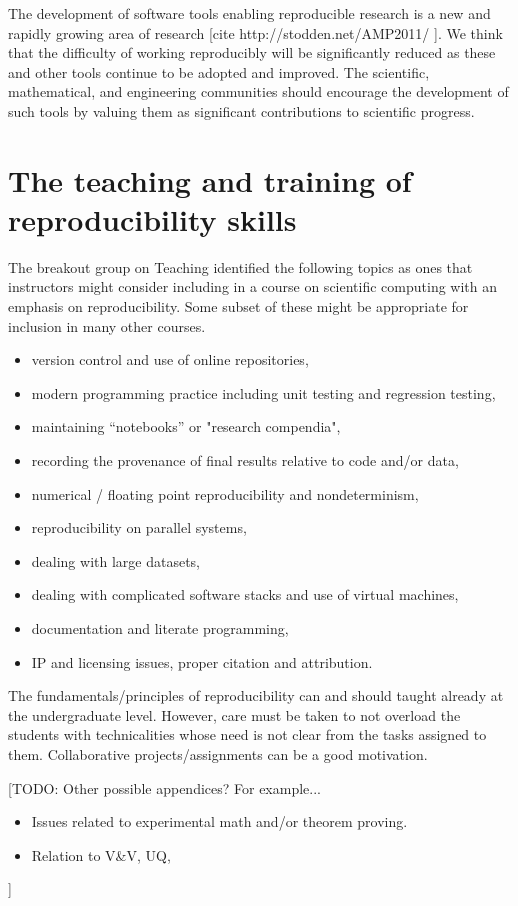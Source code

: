 \documentclass[11pt]{article}
\newcommand{\todo}[1]{{\color{red} [TODO: #1]}}
\newcommand{\todo}[1]{}
\begin{document}
The development of software tools enabling reproducible research is a new
and rapidly growing area of research [cite http://stodden.net/AMP2011/ ]. We
think that the difficulty of working reproducibly will be significantly
reduced as these and other tools continue to be adopted and improved.  The
scientific, mathematical, and engineering communities should encourage the
development of such tools by valuing them as significant contributions to
scientific progress.

\section{The teaching and training of reproducibility skills}
\label{sec:teaching2}
The breakout group on Teaching identified the following topics as ones that
instructors might consider including in a course on scientific computing
with an emphasis on reproducibility.  Some subset of these might be
appropriate for inclusion in many other courses.

\begin{itemize} 
\item version control and use of online repositories,
\item modern programming practice including unit testing and regression testing,
\item maintaining “notebooks” or "research compendia",
\item recording the provenance of final results relative to code and/or data,
\item numerical / floating point reproducibility and nondeterminism,
\item reproducibility on parallel systems,
\item dealing with large datasets,
\item dealing with complicated software stacks and use of virtual machines,
\item documentation and literate programming,
\item IP and licensing issues, proper citation and attribution.
\end{itemize} 

The fundamentals/principles of reproducibility can and should taught already
at the undergraduate level. However, care must be taken to not overload the
students with technicalities whose need is not clear from the tasks assigned
to them.  Collaborative projects/assignments can be a good motivation.

\todo{Other possible appendices? For example...
\begin{itemize}
\item Issues related to experimental math and/or theorem proving.
\item Relation to V\&V, UQ, 
\end{itemize} 
}



\end{document}
